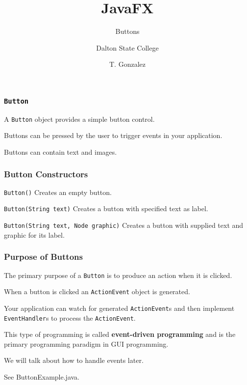 \documentclass{beamer}
\title[Buttons]{JavaFX}
\subtitle{Buttons} %
\author[]{Dalton State College}
\date[T. Gonzalez]{T. Gonzalez}
\newcommand{\mil}[1]{\texttt{#1}}
\begin{document}
\begin{frame}

	\titlepage
	
\end{frame}

\begin{frame}
    
    \frametitle{\mil{Button}}
    
    A \mil{Button} object provides a simple button control.
    
    \bigskip
   
    Buttons can be pressed by the user to trigger events in your application.
    
    \bigskip
    
    Buttons can contain text and images.  

\end{frame}
	
\begin{frame}[fragile]

	\frametitle{Button Constructors}
	
    \mil{Button()}  Creates an empty button.
    
    \bigskip
    
    \mil{Button(String text)} Creates a button with specified text as label.
    
    \bigskip
    
    \mil{Button(String text, Node graphic)}  Creates a button with supplied text and graphic for its label.
	
\end{frame}

\begin{frame}[fragile]

    \frametitle{Purpose of Buttons}
    
    The primary purpose of a \mil{Button} is to produce an action when it is clicked.
    
    \bigskip
    
    When a button is clicked an \mil{ActionEvent} object is generated.
    
    \bigskip
        
    Your application can watch for generated \mil{ActionEvent}s and then implement \mil{EventHandler}s to process the \mil{ActionEvent}.
    
    \bigskip
    
    This type of programming is called \textbf{event-driven programming} and is the primary programming paradigm in GUI programming. 
    
    \bigskip
    
    We will talk about how to handle events later.
\end{frame}

\begin{frame}

    See  ButtonExample.java.
    
\end{frame}
\end{document}
